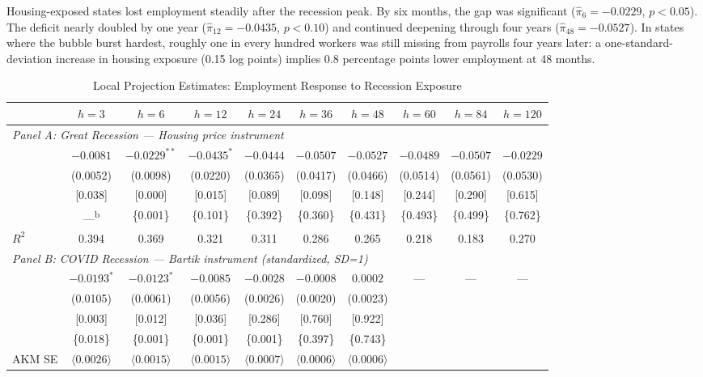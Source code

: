 \documentclass[12pt]{article}
\begin{document}
Housing-exposed states lost employment steadily after the recession peak. By six months, the gap was significant ($\hat{\pi}_6 = -0.0229$, $p < 0.05$). The deficit nearly doubled by one year ($\hat{\pi}_{12} = -0.0435$, $p < 0.10$) and continued deepening through four years ($\hat{\pi}_{48} = -0.0527$). In states where the bubble burst hardest, roughly one in every hundred workers was still missing from payrolls four years later: a one-standard-deviation increase in housing exposure (0.15 log points) implies 0.8 percentage points lower employment at 48 months.

\begin{table}[H]
\centering
\caption{Local Projection Estimates: Employment Response to Recession Exposure}
\begin{threeparttable}
\small
\begin{tabular}{lccccccccc}
\toprule
& $h=3$ & $h=6$ & $h=12$ & $h=24$ & $h=36$ & $h=48$ & $h=60$ & $h=84$ & $h=120$ \\
\midrule
\multicolumn{10}{l}{\textit{Panel A: Great Recession --- Housing price instrument}} \\[3pt]
& $-0.0081$ & $-0.0229^{**}$ & $-0.0435^{*}$ & $-0.0444$ & $-0.0507$ & $-0.0527$ & $-0.0489$ & $-0.0507$ & $-0.0229$ \\
& (0.0052) & (0.0098) & (0.0220) & (0.0365) & (0.0417) & (0.0466) & (0.0514) & (0.0561) & (0.0530) \\
& [0.038] & [0.000] & [0.015] & [0.089] & [0.098] & [0.148] & [0.244] & [0.290] & [0.615] \\
& ---\textsuperscript{b} & \{0.001\} & \{0.101\} & \{0.392\} & \{0.360\} & \{0.431\} & \{0.493\} & \{0.499\} & \{0.762\} \\
$R^2$ & 0.394 & 0.369 & 0.321 & 0.311 & 0.286 & 0.265 & 0.218 & 0.183 & 0.270  \\
\midrule
\multicolumn{10}{l}{\textit{Panel B: COVID Recession --- Bartik instrument (standardized, SD=1)}} \\[3pt]
& $-0.0193^{*}$ & $-0.0123^{*}$ & $-0.0085$ & $-0.0028$ & $-0.0008$ & $0.0002$ & --- & --- & --- \\
& (0.0105) & (0.0061) & (0.0056) & (0.0026) & (0.0020) & (0.0023) & & & \\
& [0.003] & [0.012] & [0.036] & [0.286] & [0.760] & [0.922] & & & \\
& \{0.018\} & \{0.001\} & \{0.001\} & \{0.001\} & \{0.397\} & \{0.743\} & & & \\
AKM SE & $\langle0.0026\rangle$ & $\langle0.0015\rangle$ & $\langle0.0015\rangle$ & $\langle0.0007\rangle$ & $\langle0.0006\rangle$ & $\langle0.0006\rangle$ & & & \\

\end{tabular}
\end{threeparttable}
\end{table}
\end{document}
